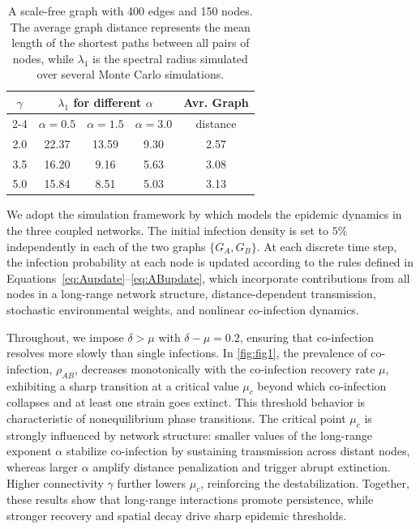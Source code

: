 \documentclass[a4paper,12pt]{scrartcl}
\theoremstyle{plain}%
\theoremstyle{definition}
\theoremstyle{remark}
\numberwithin{equation}{section}
\begin{document}
\begin{table}[ht!]
\centering
\begin{tabular}{c|ccc|c}
\hline
$\gamma$ & \multicolumn{3}{c|}{$\lambda_{1}$ for different $\alpha$} & Avr. Graph  \\
\cline{2-4}
 & $\alpha = 0.5$ & $\alpha = 1.5$ & $\alpha = 3.0$ & distance \\
\hline
2.0 & 22.37 & 13.59 &  9.30 & 2.57\\
3.5 & 16.20 &  9.16 &  5.63 & 3.08\\
5.0 & 15.84 &  8.51 &  5.03 & 3.13\\
\hline
\end{tabular}
\caption{A scale-free graph with 400 edges and 150 nodes. The average graph distance represents the mean length of the shortest paths between all pairs of nodes, while $\lambda_1$ is the spectral radius simulated over several Monte Carlo simulations.}
\label{tab:sfgraph}
\end{table}

We adopt the simulation framework by \cite{Namugera2025contact} which models the epidemic dynamics in the three coupled networks. The initial infection density is set to \(5\%\) independently in each of the two graphs $\{G_A, G_B\}$. At each discrete time step, the infection probability at each node is updated according to the rules defined in Equations~\eqref{eq:Aupdate}--\eqref{eq:ABupdate}, which incorporate contributions from all nodes in a long-range network structure, distance-dependent transmission, stochastic environmental weights, and nonlinear co-infection dynamics.



Throughout, we impose $\delta > \mu$ with $\delta - \mu = 0.2$, ensuring that co-infection resolves more slowly than single infections. In \autoref{fig:fig1}, the prevalence of co-infection, $\rho_{AB}$, decreases monotonically with the co-infection recovery rate $\mu$, exhibiting a sharp transition at a critical value $\mu_c$ beyond which co-infection collapses and at least one strain goes extinct. This threshold behavior is characteristic of nonequilibrium phase transitions. The critical point $\mu_c$ is strongly influenced by network structure: smaller values of the long-range exponent $\alpha$ stabilize co-infection by sustaining transmission across distant nodes, whereas larger $\alpha$ amplify distance penalization and trigger abrupt extinction. Higher connectivity $\gamma$ further lowers $\mu_c$, reinforcing the destabilization. Together, these results show that long-range interactions promote persistence, while stronger recovery and spatial decay drive sharp epidemic thresholds.
\end{document}
